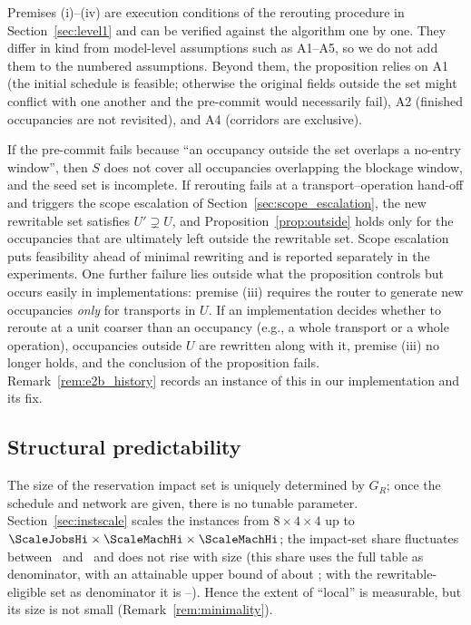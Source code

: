 Premises (i)--(iv) are execution conditions of the rerouting procedure in Section~\ref{sec:level1} and can be verified against the algorithm one by one.
They differ in kind from model-level assumptions such as A1--A5, so we do not add them to the numbered assumptions. Beyond them, the proposition relies on
A1 (the initial schedule is feasible; otherwise the original fields outside the set might conflict with one another and the pre-commit would necessarily fail),
A2 (finished occupancies are not revisited), and A4 (corridors are exclusive).

\begin{remark}
\label{rem:precommit}
If the pre-commit fails because ``an occupancy outside the set overlaps a no-entry window'', then \(S\) does not cover all occupancies overlapping the blockage window, and the seed set is incomplete.
If rerouting fails at a transport--operation hand-off and triggers the scope escalation of Section~\ref{sec:scope_escalation}, the new rewritable set satisfies
\(U'\supsetneq U\), and Proposition~\ref{prop:outside} holds only for the occupancies that are ultimately left outside the rewritable set.
Scope escalation puts feasibility ahead of minimal rewriting and is reported separately in the experiments.
One further failure lies outside what the proposition controls but occurs easily in implementations: premise (iii) requires the router to generate new occupancies \emph{only}
for transports in \(U\). If an implementation decides whether to reroute at a unit coarser than an occupancy (e.g., a whole transport or a whole operation),
occupancies outside \(U\) are rewritten along with it, premise (iii) no longer holds, and the conclusion of the proposition fails.
Remark~\ref{rem:e2b_history} records an instance of this in our implementation and its fix.
\end{remark}

\subsection{Structural predictability}
\label{sec:structure}

The size of the reservation impact set is uniquely determined by \(G_R\); once the schedule and network are given, there is no tunable parameter. Section~\ref{sec:instscale} scales the instances from \(8\times4\times4\) up to
\(\ScaleJobsHi\times\ScaleMachHi\times\ScaleMachHi\); the impact-set share fluctuates between
\ScaleCloLo\ and \ScaleCloHi\ and does not rise with size (this share uses the full table as denominator, with an attainable upper bound of about
\ScaleAliveShare; with the rewritable-eligible set as denominator it is \ScaleCloAliveLo--\ScaleCloAliveHi).
Hence the extent of ``local'' is measurable, but its size is not small (Remark~\ref{rem:minimality}).

